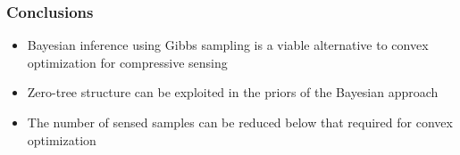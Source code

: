 \documentclass{beamer}
\begin{document}
\begin{frame}
\frametitle{Conclusions}
\begin{itemize}
  \item Bayesian inference using Gibbs sampling is a viable
    alternative to convex optimization for compressive sensing
  \item Zero-tree structure can be exploited in the priors of the
    Bayesian approach
  \item The number of sensed samples can be reduced below that
    required for convex optimization
\end{itemize}
\end{frame}

\end{document}
